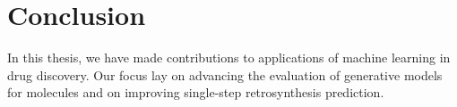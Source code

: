 \chapter{Conclusion\label{chap:conclusion}}
In this thesis, we have made contributions to applications of machine learning in
drug discovery. Our focus lay on advancing the evaluation of generative models for
molecules and on improving single-step retrosynthesis prediction.

